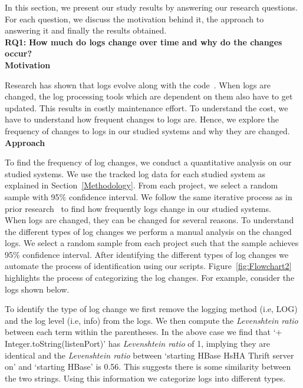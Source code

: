 In this section, we present our study results by answering our research questions. For each question, we discuss the motivation behind it, the approach to answering it and finally the results obtained. 
\\

\noindent\textbf{RQ1:} \textbf{How much do logs change over time and why do the changes occur?}
\\

\noindent\textbf{Motivation}

Research has shown that logs evolve along with the code~\cite{IanContextinformation}. When logs are changed, the log  processing tools which are dependent on them also have to get updated. This results in costly maintenance effort. To understand the cost, we have to understand how frequent changes to logs are. Hence, we explore the frequency of changes to logs in our studied systems and why they are changed.\\

\noindent \textbf{Approach}

To find the frequency of log changes, we conduct a quantitative analysis on our studied systems. We use the tracked log data for each studied system as explained in Section~\ref{Methodology}. From each project, we select a random sample with 95\% confidence interval. We follow the same iterative process as in prior research~\cite{IanIcesm} to find how frequently logs change in our studied systems. \\

When logs are changed, they can be changed for several reasons. To understand the different types of log changes we perform a manual analysis on the changed logs. We select a random sample from each project such that the sample achieves 95\% confidence interval. After identifying the different types of log changes we automate the process of identification using our scripts. Figure~\ref{fig:Flowchart2} highlights the process of categorizing the log changes. For example, 
consider the logs shown below. 




To identify the type of log change we first remove the logging method (i.e, LOG) and the log level (i.e, info) from the logs. We then compute the \textsl{Levenshtein ratio} between each term within the parentheses. In the above case we find that `+ Integer.toString(listenPort)' has \textsl{Levenshtein ratio} of 1, implying they are identical and the \textsl{Levenshtein ratio} between `starting HBase HsHA Thrift server on' and `starting HBase' is 0.56. This suggests there is some similarity between the two strings. Using this information we categorize logs into different types.

